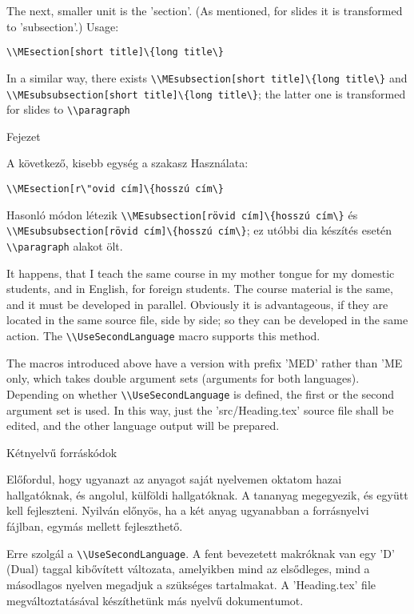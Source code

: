 {
The next, smaller unit is the 'section'.
(As mentioned, for slides it is transformed to 'subsection'.)
Usage:\par
\noindent\lstinline|\\MEsection[short title]\{long title\}|

In a similar way, there exists \lstinline|\\MEsubsection[short title]\{long title\}|
and \lstinline|\\MEsubsubsection[short title]\{long title\}|; the latter one is
transformed for slides to \lstinline|\\paragraph|
}
{Fejezet}
{
A következő, kisebb egység a szakasz
Használata:\par
\noindent\lstinline|\\MEsection[r\"ovid cím]\{hosszú cím\}|

Hasonló módon létezik \lstinline|\\MEsubsection[rövid cím]\{hosszú cím\}|
és \lstinline|\\MEsubsubsection[rövid cím]\{hosszú cím\}|; 
ez utóbbi dia készítés esetén \lstinline|\\paragraph| alakot ölt.

}


{
It happens, that I teach the same course in my mother tongue for my domestic students,
and in English, for foreign students.
The course material is the same, and it must be developed in parallel.
Obviously it is advantageous, if they are located in the same source file, side by side;
so they can be developed in the same action.
The \lstinline|\\UseSecondLanguage| macro supports this method.

The macros introduced above have a version with prefix 'MED' rather than 'ME only,
which takes double argument sets (arguments for both languages). Depending on whether \lstinline|\\UseSecondLanguage| is defined,
the first or the second argument set is used. In this way, just the 'src/Heading.tex'
source file shall be edited, and the other language output will be prepared.
}
{Kétnyelvű forráskódok}
{
Előfordul, hogy ugyanazt az anyagot saját nyelvemen oktatom hazai hallgatóknak,
és angolul, külföldi hallgatóknak. A tananyag megegyezik, és együtt kell fejleszteni.
Nyilván előnyös, ha a két anyag ugyanabban a forrásnyelvi fájlban, egymás mellett fejleszthető.

Erre szolgál a \lstinline|\\UseSecondLanguage|. A fent bevezetett makróknak van egy 'D' (Dual) taggal
kibővített változata, amelyikben mind az elsődleges, mind a másodlagos nyelven 
megadjuk a szükséges tartalmakat. A 'Heading.tex' file megváltoztatásával készíthetünk 
más nyelvű dokumentumot.
}

